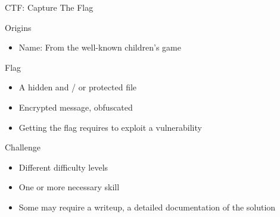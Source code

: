 \documentclass[12 pt]{beamer}
\begin{document}

\begin{frame}{CTF: Capture The Flag}

  \begin{block}{Origins}
    \begin{itemize}
      \item{Name: From the well-known children's game}
    \end{itemize}
  \end{block}

  \begin{block}{Flag}
    \begin{itemize}
        \item{A hidden and / or protected file}
        \item{Encrypted message, obfuscated}
        \item{Getting the flag requires to exploit a vulnerability}
    \end{itemize}
  \end{block}
  
  \begin{block}{Challenge}
    \begin{itemize}
        \item{Different difficulty levels}
        \item{One or more necessary skill}
        \item{Some may require a writeup, a detailed documentation of the solution}
    \end{itemize}
  \end{block}
  

\end{frame}

\end{document}
